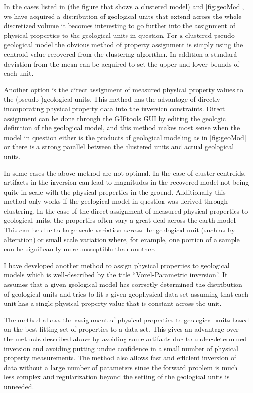In the cases listed in (the figure that shows a clustered model) and \autoref{fig:geoMod}, we have acquired a distribution of geological units that extend across the whole discretized volume it becomes interesting to go further into the assignment of physical properties to the geological units in question. For a clustered pseudo-geological model the obvious method of property assignment is simply using the centroid value recovered from the clustering algorithm. In addition a standard deviation from the mean can be acquired to set the upper and lower bounds of each unit.

Another option is the direct assignment of measured physical property values to the (pseudo-)geological units. This method has the advantage of directly incorporating physical property data into the inversion constraints. Direct assignment can be done through the GIFtools \ac{GUI} by editing the geologic definition of the geological model, and this method makes most sense when the model in question either is the products of geological modeling as in \autoref{fig:geoMod} or there is a strong parallel between the clustered units and actual geological units. 

In some cases the above method are not optimal. In the case of cluster centroids, artifacts in the inversion can lead to magnitudes in the recovered model not being quite in scale with the physical properties in the ground. Additionally this method only works if the geological model in question was derived through clustering. In the case of the direct assignment of measured physical properties to geological units, the properties often vary a great deal across the earth model. This can be due to large scale variation across the geological unit (such as by alteration) or small scale variation where, for example, one portion of a sample can be significantly more susceptible than another.

I have developed another method to assign physical properties to geological models which is well-described by the title ``Voxel-Parametric inversion''. It assumes that a given geological model has correctly determined the distribution of geological units and tries to fit a given geophysical data set assuming that each unit has a single physical property value that is constant across the unit. 

The method allows the assignment of physical properties to geological units based on the best fitting set of properties to a data set. This gives an advantage over the methods described above by avoiding some artifacts due to under-determined inversion and avoiding putting undue confidence in a small number of physical property measurements. The method also allows fast and efficient inversion of data without a large number of parameters since the forward problem is much less complex and regularization beyond the setting of the geological units is unneeded.

